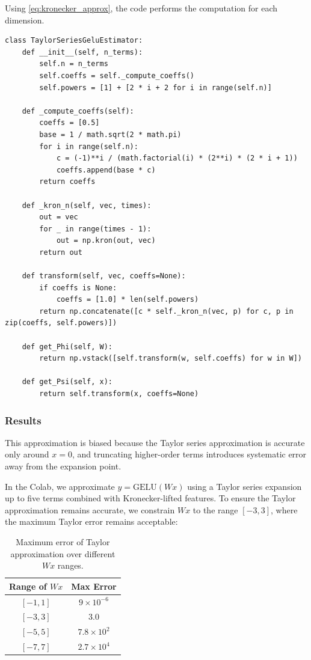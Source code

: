 \documentclass{article}
\begin{document}
Using \eqref{eq:kronecker_approx}, the code performs the computation for each dimension.

\begin{lstlisting}
class TaylorSeriesGeluEstimator:
    def __init__(self, n_terms):
        self.n = n_terms
        self.coeffs = self._compute_coeffs()
        self.powers = [1] + [2 * i + 2 for i in range(self.n)]

    def _compute_coeffs(self):
        coeffs = [0.5]
        base = 1 / math.sqrt(2 * math.pi)
        for i in range(self.n):
            c = (-1)**i / (math.factorial(i) * (2**i) * (2 * i + 1))
            coeffs.append(base * c)
        return coeffs

    def _kron_n(self, vec, times):
        out = vec
        for _ in range(times - 1):
            out = np.kron(out, vec)
        return out

    def transform(self, vec, coeffs=None):
        if coeffs is None:
            coeffs = [1.0] * len(self.powers)
        return np.concatenate([c * self._kron_n(vec, p) for c, p in zip(coeffs, self.powers)])

    def get_Phi(self, W):
        return np.vstack([self.transform(w, self.coeffs) for w in W])

    def get_Psi(self, x):
        return self.transform(x, coeffs=None)
\end{lstlisting}

\subsubsection{Results}

This approximation is biased because the Taylor series approximation is accurate only around $x = 0$, and truncating higher-order terms introduces systematic error away from the expansion point.

In the Colab, we approximate \( y = \text{GELU}(W x) \) using a Taylor series expansion up to five terms combined with Kronecker-lifted features. To ensure the Taylor approximation remains accurate, we constrain \( W x \) to the range \([-3, 3]\), where the maximum Taylor error remains acceptable:

\begin{table}[h!]
\centering
\begin{tabular}{|c|c|}
\hline
\textbf{Range of \( W x \)} & \textbf{Max Error} \\ \hline
\([-1, 1]\) & \(9 \times 10^{-6}\) \\ \hline
\([-3, 3]\) & \(3.0\) \\ \hline
\([-5, 5]\) & \(7.8 \times 10^2\) \\ \hline
\([-7, 7]\) & \(2.7 \times 10^4\) \\ \hline
\end{tabular}
\caption{Maximum error of Taylor approximation over different \( W x \) ranges.}
\end{table}
\end{document}
